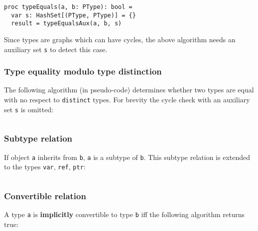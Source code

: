\begin{verbatim}
proc typeEquals(a, b: PType): bool =
  var s: HashSet[(PType, PType)] = {}
  result = typeEqualsAux(a, b, s)
\end{verbatim}

Since types are graphs which can have cycles, the above algorithm needs
an auxiliary set \texttt{s} to detect this case.

\hypertarget{type-equality-modulo-type-distinction}{%
\subsubsection{Type equality modulo type
distinction}\label{type-equality-modulo-type-distinction}}

The following algorithm (in pseudo-code) determines whether two types
are equal with no respect to \texttt{distinct} types. For brevity the
cycle check with an auxiliary set \texttt{s} is omitted:

\begin{verbatim}
\end{verbatim}

\hypertarget{subtype-relation}{%
\subsubsection{Subtype relation}\label{subtype-relation}}

If object \texttt{a} inherits from \texttt{b}, \texttt{a} is a subtype
of \texttt{b}. This subtype relation is extended to the types
\texttt{var}, \texttt{ref}, \texttt{ptr}:

\begin{verbatim}
\end{verbatim}

\hypertarget{convertible-relation}{%
\subsubsection{Convertible relation}\label{convertible-relation}}

A type \texttt{a} is \textbf{implicitly} convertible to type \texttt{b}
iff the following algorithm returns true:

